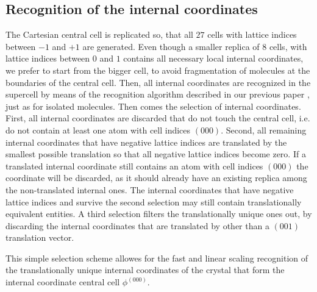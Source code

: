 \documentclass[prl,aps,preprint,superbib,12pt]{revtex4}
\begin{document}
\subsection{Recognition of the internal coordinates}
The Cartesian central cell is replicated so, that all $27$ 
cells with lattice indices between $-1$ and $+1$ are generated.
Even though a smaller replica of 8 cells, with lattice indices
between $0$ and $1$ contains all necessary local internal coordinates,
we prefer to start from the bigger cell, to avoid fragmentation
of molecules at the boundaries of the central cell.
Then, all internal coordinates are recognized in the supercell
by means of the recognition algorithm described in our previous paper
\cite{KNemeth04}, just as for isolated molecules.
Then comes the selection of internal coordinates.
First, all internal coordinates are discarded that do not touch 
the central cell, i.e. do not contain at least one atom with
cell indices $(000)$.
Second, all remaining internal coordinates that have 
negative lattice indices
are translated by the smallest possible translation so that all 
negative lattice indices become zero. If a translated 
internal coordinate
still contains an atom with cell indices $(000)$
the coordinate will be discarded, as it should already have an existing
replica among the non-translated internal ones.
The internal coordinates that have negative
lattice indices and survive the second selection may still
contain translationally equivalent entities. A third selection
filters the translationally unique ones out, by discarding
the internal coordinates that are translated 
by other than a $(001)$ translation vector.

This simple selection scheme allowes for the fast and linear scaling 
recognition of the translationally unique internal coordinates
of the crystal that form the internal coordinate central 
cell $\phi^{(000)}$.
\end{document}
